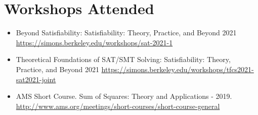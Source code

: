 \section{Workshops Attended}

\begin{itemize}
  \item Beyond Satisfiability: Satisfiability: 
    Theory, Practice, and Beyond 2021 
    \url{https://simons.berkeley.edu/workshops/sat-2021-1}
  \item Theoretical Foundations of SAT/SMT Solving: 
    Satisfiability: Theory, Practice, and Beyond 2021
    \url{https://simons.berkeley.edu/workshops/tfcs2021-sat2021-joint}
  \item AMS Short Course. Sum of Squares: Theory and Applications - 2019.
    \url{http://www.ams.org/meetings/short-courses/short-course-general}
\end{itemize}
